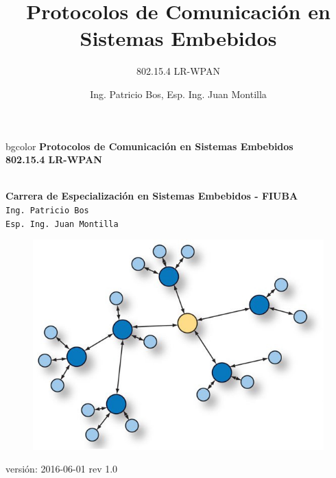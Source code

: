 \documentclass[aspectratio=169]{beamer}
\title[802.15.4 LR-WPAN]{Protocolos de Comunicación en Sistemas Embebidos}
\subtitle{802.15.4 LR-WPAN}
\author[]{Ing. Patricio Bos, Esp. Ing. Juan Montilla}
\institute[CESE-FIUBA]{Carrera de Especialización en Sistemas Embebidos - FIUBA}
\date{}
\begin{document}

%



\begingroup
\makeatletter
\setlength{\hoffset}{-.5\beamer@sidebarwidth}
\makeatother
\begin{frame}
\begin{center}
\hfill
    \begin{beamercolorbox}[center,dp=3ex,ht=10.25ex, wd=1\linewidth]{bgcolor}
        \Large\textbf{Protocolos de Comunicación en Sistemas Embebidos}\\
        \huge\textbf{802.15.4 LR-WPAN}
    \end{beamercolorbox}
\hfill\hfill
\\
\vspace{5px}
\textbf{Carrera de Especialización en Sistemas Embebidos - FIUBA}\\
\vspace{10px}
\texttt{Ing. Patricio Bos}\\
\texttt{Esp. Ing. Juan Montilla}\\

\vspace{10px}

\begin{figure}[H]
	\includegraphics[width=.3\textwidth]{./imagenes/red.jpg}
\end{figure}	  	  	
\vspace{5px}
\tiny versión: 2016-06-01 rev 1.0 

\end{center}
\end{frame}
\endgroup
\end{document}
